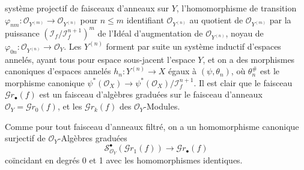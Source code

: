 système projectif de faisceaux d'anneaux sur $Y$, l'homomorphisme de transition
$\varphi_{nm}:\mathcal{O}_{Y^{(m)}}\to\mathcal{O}_{Y^{(n)}}$ pour $n\leq m$
identifiant $\mathcal{O}_{Y^{(n)}}$ au quotient de $\mathcal{O}_{Y^{(m)}}$ par la
puissance $(\mathscr{I}_f/\mathscr{I}_f^{n+1})^m$ de l'Idéal d'augmentation de
$\mathcal{O}_{Y^{(n)}}$, noyau de
$\varphi_{0n}:\mathcal{O}_{Y^{(n)}}\to\mathcal{O}_Y$. Les $Y^{(n)}$ forment par
suite un système inductif d'espaces annelés, ayant tous pour espace sous-jacent
l'espace $Y$, et on a des morphismes canoniques d'espaces annelés
$h_n:Y^{(n)}\to X$ égaux à $(\psi,\theta_n)$, où $\theta_n^\#$ est le morphisme
canonique
$\psi^*(\mathcal{O}_X)\to\psi^*(\mathcal{O}_X)/\mathscr{I}_f^{n+1}$.
Il est clair que le faisceau $\mathscr{G}r_\bullet(f)$ est un faisceau d'algèbres
graduées sur le faisceau d'anneaux
$\mathcal{O}_Y=\mathscr{G}r_0(f)$, et les $\mathscr{G}r_k(f)$ des
$\mathcal{O}_Y$-Modules.

Comme pour tout faisceau d'anneaux filtré, on a un homomorphisme canonique
surjectif de $\mathcal{O}_Y$-Algèbres graduées
\[
  \mathscr{S}_{\mathcal{O}_Y}^{\bullet}(\mathscr{G}r_1(f))
  \longrightarrow\mathscr{G}r_\bullet(f)
  \tag{16.1.2.2}
  \label{IV.16.1.2.2}
\]
coïncidant en degrés 0 et 1 avec les homomorphismes identiques.

